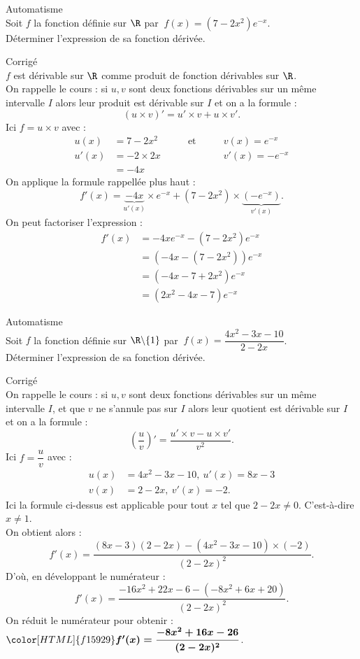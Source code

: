 \documentclass[a4paper,11pt,exos]{nsi} %
\newcounter{autNum}
\newcommand{\aut}[1]
{
	\addtocounter{autNum}{1}
	{\titlefont\color{UGLiBlue}\Large Automatisme\ \theautNum\ \normalsize{#1}}\smallskip	
}
\newcounter{corNum}
\newcommand{\cor}[1]
{
	\addtocounter{corNum}{1}
	{\titlefont\color{UGLiOrange}\Large Corrigé\ \thecorNum\ \normalsize{#1}}\smallskip	
}
\begin{document}
\aut{}\\%
Soit $f$ la fonction définie sur $\R$ par $\ f(x)=(7-2x^2)e^{-x}$.\\
Déterminer l'expression de sa fonction dérivée.\\

\cor{}\\
$f$ est dérivable sur $\R$ comme produit de fonction dérivables sur $\R$.\\
On rappelle le cours : si $u,v$ sont  deux fonctions dérivables sur un même intervalle $I$ alors leur produit est dérivable sur $I$ et on a la formule : \[(u\times v)'=u'\times v+u\times v'.\]
Ici $f=u\times v$ avec : \[\begin{aligned}u(x)&=7-2x^2&\qquad \text{et}\qquad & v(x)=e^{-x}\\ 
	u'(x)&=-2\times 2x & &v'(x)=-e^{-x}\\
	& =-4x & &\end{aligned}\]
	On applique la  formule rappellée plus haut : \[f'(x)=\underbrace{-4x}_{u'(x)}\times e^{-x}+(7-2x^2)\times\underbrace{(-e^{-x})}_{v'(x)}.\]
	On peut factoriser l'expression : \[\begin{aligned}f'(x)&=-4xe^{-x}-(7-2x^2)e^{-x}\\ & =\left(-4x-(7-2x^2)\right)e^{-x}\\ & = \left(-4x-7+2x^2\right)e^{-x}\\ & = \left(2x^2-4x-7\right)e^{-x}\end{aligned}\]



\aut{}\\%
Soit $f$ la fonction définie sur $\R\backslash\{1\}$ par $\ f(x)=\dfrac{4x^2-3x-10}{2-2x}$.\\
Déterminer l'expression de sa fonction dérivée.\\

\cor{}\\
On rappelle le cours : si $u,v$ sont  deux fonctions dérivables sur un même intervalle $I$, et que $v$ ne s'annule pas sur $I$ alors leur quotient est dérivable sur $I$ et on a la formule : \[\left(\dfrac{u}{v}\right)'=\dfrac{u'\times v-u\times v'}{v^2}.\]Ici $f=\dfrac{u}{v}$ avec : \[\begin{aligned}u(x)&=4x^2-3x-10,\ u'(x)=8x-3\\ v(x)&=2-2x,\ v'(x)=-2.\end{aligned}\]Ici la formule ci-dessus est applicable pour tout $x$ tel que $2-2x\neq 0$. C'est-à-dire $x\neq1$.\\On obtient alors : \[f'(x)=\dfrac{(8x-3)(2-2x)-(4x^2-3x-10)\times(-2)}{(2-2x)^2}.\]D'où, en développant le numérateur : \[f'(x)=\dfrac{-16x^{2}+22x-6-(-8x^{2}+6x+20)}{(2-2x)^2}.\]On réduit le numérateur pour obtenir : ${\color[HTML]{f15929}\boldsymbol{f'(x)=\dfrac{-8x^{2}+16x-26}{(2-2x)^2}}}$.\\
\end{document}
